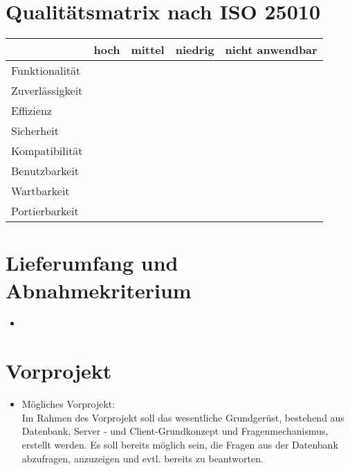 \documentclass[11pt,a4paper]{scrreprt}
\begin{document}
\chapter{Qualitätsmatrix nach ISO 25010}
\begin{tabular}{|l|c|c|c|c|}
\hline
		& hoch & mittel & niedrig& nicht anwendbar\\
\hline
Funktionalität  &              &              & 		&\\     
Zuverlässigkeit	&              &              & 		&\\
Effizienz 		&              &              & 		&\\
Sicherheit  	&              &              & 		&\\
Kompatibilität  &              &              & 		&\\
Benutzbarkeit  	&              &              & 		&\\
Wartbarkeit  	&              &              & 		&\\
Portierbarkeit  &              &              & 		&\\
\hline
\end{tabular}

\chapter{Lieferumfang und Abnahmekriterium}
\begin{itemize}
\item
\end{itemize}

\chapter{Vorprojekt}
\begin{itemize}
\item Mögliches Vorprojekt: \\
Im Rahmen des Vorprojekt soll das wesentliche Grundgerüst, bestehend aus Datenbank, Server - und Client-Grundkonzept und Fragenmechanismus, erstellt werden. Es soll bereits möglich sein, die Fragen aus der Datenbank abzufragen, anzuzeigen und evtl. bereits zu beantworten.
\end{itemize}
\end{document}
